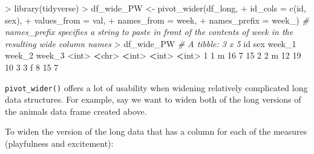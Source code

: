 \documentclass[
]{book}
\newenvironment{Shaded}{\begin{snugshade}}{\end{snugshade}}
\newcommand{\AttributeTok}[1]{\textcolor[rgb]{0.77,0.63,0.00}{#1}}
\newcommand{\CommentTok}[1]{\textcolor[rgb]{0.56,0.35,0.01}{\textit{#1}}}
\newcommand{\DecValTok}[1]{\textcolor[rgb]{0.00,0.00,0.81}{#1}}
\newcommand{\ErrorTok}[1]{\textcolor[rgb]{0.64,0.00,0.00}{\textbf{#1}}}
\newcommand{\FunctionTok}[1]{\textcolor[rgb]{0.00,0.00,0.00}{#1}}
\newcommand{\NormalTok}[1]{#1}
\newcommand{\OtherTok}[1]{\textcolor[rgb]{0.56,0.35,0.01}{#1}}
\newcommand{\SpecialCharTok}[1]{\textcolor[rgb]{0.00,0.00,0.00}{#1}}
\newcommand{\StringTok}[1]{\textcolor[rgb]{0.31,0.60,0.02}{#1}}
\begin{document}
\begin{Shaded}
\begin{Highlighting}[]
\SpecialCharTok{\textgreater{}} \FunctionTok{library}\NormalTok{(tidyverse)}
\SpecialCharTok{\textgreater{}}\NormalTok{ df\_wide\_PW }\OtherTok{\textless{}{-}} \FunctionTok{pivot\_wider}\NormalTok{(df\_long,}
\SpecialCharTok{+}                           \AttributeTok{id\_cols =} \FunctionTok{c}\NormalTok{(}\StringTok{\textquotesingle{}id\textquotesingle{}}\NormalTok{, }\StringTok{\textquotesingle{}sex\textquotesingle{}}\NormalTok{),}
\SpecialCharTok{+}                           \AttributeTok{values\_from =} \StringTok{\textquotesingle{}val\textquotesingle{}}\NormalTok{,}
\SpecialCharTok{+}                           \AttributeTok{names\_from =} \StringTok{\textquotesingle{}week\textquotesingle{}}\NormalTok{,}
\SpecialCharTok{+}                           \AttributeTok{names\_prefix =} \StringTok{\textquotesingle{}week\_\textquotesingle{}}\NormalTok{) }\CommentTok{\# \textasciigrave{}names\_prefix\textasciigrave{} specifies a string to paste in front of the contents of \textquotesingle{}week\textquotesingle{} in the resulting wide column names}
\SpecialCharTok{\textgreater{}}\NormalTok{ df\_wide\_PW}
\CommentTok{\# A tibble: 3 x 5}
\NormalTok{     id sex   week\_1 week\_2 week\_3}
  \SpecialCharTok{\textless{}}\NormalTok{int}\SpecialCharTok{\textgreater{}} \ErrorTok{\textless{}}\NormalTok{chr}\SpecialCharTok{\textgreater{}}  \ErrorTok{\textless{}}\NormalTok{int}\SpecialCharTok{\textgreater{}}  \ErrorTok{\textless{}}\NormalTok{int}\SpecialCharTok{\textgreater{}}  \ErrorTok{\textless{}}\NormalTok{int}\SpecialCharTok{\textgreater{}}
\DecValTok{1}     \DecValTok{1}\NormalTok{ m         }\DecValTok{16}      \DecValTok{7}     \DecValTok{15}
\DecValTok{2}     \DecValTok{2}\NormalTok{ m         }\DecValTok{12}     \DecValTok{19}     \DecValTok{10}
\DecValTok{3}     \DecValTok{3}\NormalTok{ f          }\DecValTok{8}     \DecValTok{15}      \DecValTok{7}
\end{Highlighting}
\end{Shaded}

\texttt{pivot\_wider()} offers a lot of usability when widening relatively complicated long data structures. For example, say we want to widen both of the long versions of the animals data frame created above.

To widen the version of the long data that has a column for each of the measures (playfulness and excitement):
\end{document}
